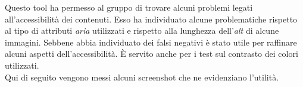 Questo tool ha permesso al gruppo di trovare alcuni problemi legati all'accessibilità dei contenuti. Esso ha individuato alcune problematiche rispetto al tipo di attributi \textit{aria} utilizzati e rispetto alla lunghezza dell'\textit{alt} di alcune immagini. Sebbene abbia individuato dei falsi negativi è stato utile per raffinare alcuni aspetti dell'accessibilità. È servito anche per i test sul contrasto dei colori utilizzati.\\
Qui di seguito vengono messi alcuni screenshot che ne evidenziano l'utilità.